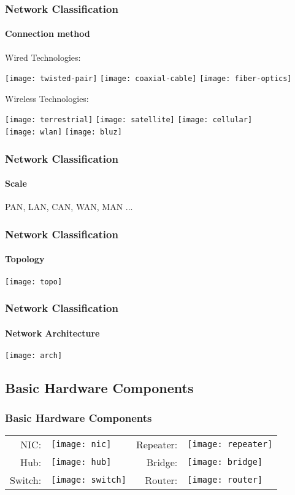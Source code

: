 \documentclass[hyperref={xetex,colorlinks,linkcolor=blue},green,compress]{beamer}
\begin{document}
\begin{frame}\frametitle{Network Classification}\framesubtitle{Connection method}

  Wired Technologies:
\begin{center}
\texttt{[image: twisted-pair]}
\texttt{[image: coaxial-cable]}
\texttt{[image: fiber-optics]}
\end{center}
Wireless Technologies:
\begin{center}
\texttt{[image: terrestrial]}
\texttt{[image: satellite]}
\texttt{[image: cellular]}\\
\texttt{[image: wlan]}
\texttt{[image: bluz]}
\end{center}
\end{frame}

\begin{frame}\frametitle{Network Classification}\framesubtitle{Scale}
\small{PAN}, \large{LAN}, \Large{CAN}, \LARGE{WAN}, \Huge{MAN} ...
\end{frame}

\begin{frame}\frametitle{Network Classification}\framesubtitle{Topology}
  \texttt{[image: topo]}
\end{frame}

\begin{frame}\frametitle{Network Classification}\framesubtitle{Network Architecture}
\texttt{[image: arch]}
\end{frame}

\subsection[Hardwares]{Basic Hardware Components}
\label{sec:hw}

\begin{frame}\frametitle{Basic Hardware Components}
\begin{center}
\begin{tabular}{rl|rl}
 NIC:&\texttt{[image: nic]}&Repeater:&\texttt{[image: repeater]}\\
 Hub:&\texttt{[image: hub]}&Bridge:&\texttt{[image: bridge]}\\
 Switch:&\texttt{[image: switch]}&Router:&\texttt{[image: router]}
\end{tabular}
\end{center}
\end{frame}
\end{document}
